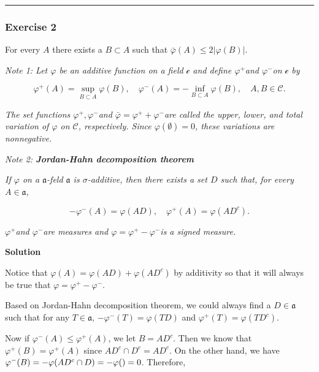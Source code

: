 \documentclass[
]{article}
\begin{document}
\begin{center}\rule{0.5\linewidth}{0.5pt}\end{center}

\hypertarget{exercise-2}{%
  \subsubsection{Exercise 2}\label{exercise-2}}

For every \(A\) there exists a \(B\subset A\) such that
\(\bar{\varphi}(A)\le 2|\varphi(B)|\).

\emph{Note 1: Let \(\varphi\) be an additive function on a field
  \(\mathcal{c}\) and define \(\varphi^{+}\)and \(\varphi^{-}\)on
  \(\mathcal c\) by}

\[\varphi^{+}(A)=\sup _{B \subset A} \varphi(B), \quad \varphi^{-}(A)=-\inf _{B \subset A} \varphi(B), \quad A, B \in \mathcal{C} .\]

\emph{The set functions \(\varphi^{+}, \varphi^{-}\)and
  \(\bar{\varphi}=\varphi^{+}+\varphi^{-}\)are called the upper, lower,
  and total variation of \(\varphi\) on \(\mathcal{C}\), respectively.
  Since \(\varphi(\emptyset)=0\), these variations are nonnegative.}

\emph{Note 2: \textbf{Jordan-Hahn decomposition theorem}}

\emph{If \(\varphi\) on a \(\mathfrak{a}\)-feld \(\mathfrak{a}\) is
  \(\sigma\)-additive, then there exists a set \(D\) such that, for every
  \(A \in \mathfrak{a}\),}

\[-\varphi^{-}(A)=\varphi(A D), \quad \varphi^{+}(A)=\varphi\left(A D^c\right) .\]

\emph{\(\varphi^{+}\)and \(\varphi^{-}\)are measures and
  \(\varphi=\varphi^{+}-\varphi^{-}\)is a signed measure.}

\textbf{Solution}

Notice that \(\varphi(A) = \varphi(AD) + \varphi(AD^c)\) by additivity
so that it will always be true that \(\varphi = \varphi^+ - \varphi^-\).

Based on Jordan-Hahn decomposition theorem, we could always find a
\(D\in \mathfrak{a}\) such that for any \(T\in \mathfrak{a}\),
\(-\varphi^-(T) = \varphi(TD)\) and \(\varphi^+(T) = \varphi(TD^c)\).

Now if \(\varphi^-(A) \le \varphi^+(A)\), we let \(B = AD^c\). Then we
know that \(\varphi^+(B) = \varphi^+(A)\) since \(AD^c\cap D^c = AD^c\).
On the other hand, we have
\(\varphi^-(B) = -\varphi(AD^c\cap D) = -\varphi(\empty) = 0\).
Therefore,
\end{document}

